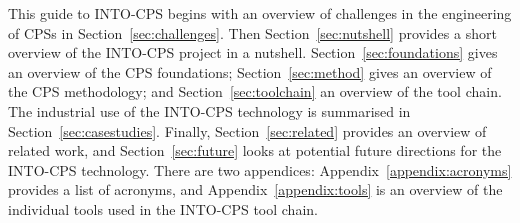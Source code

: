 This guide to INTO-CPS begins with an overview of challenges in the engineering of CPSs in Section~\ref{sec:challenges}. Then Section~\ref{sec:nutshell} provides a short overview of the INTO-CPS project in a nutshell. Section~\ref{sec:foundations} gives an overview of the CPS foundations; Section~\ref{sec:method} gives an overview of the CPS methodology; and Section~\ref{sec:toolchain} an overview of the tool chain. The industrial use of the INTO-CPS technology is summarised in Section~\ref{sec:casestudies}. Finally, Section~\ref{sec:related} provides an overview of related work, and Section~\ref{sec:future} looks at potential future directions for the INTO-CPS technology. 
There are two appendices: Appendix~\ref{appendix:acronyms} provides a list of acronyms,  
and Appendix~\ref{appendix:tools} is an overview of the individual tools used in the INTO-CPS tool chain.


